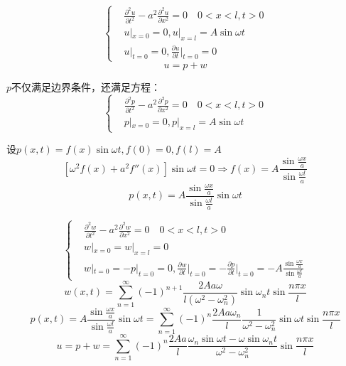 \begin{ex}
$$\left\{\begin{aligned}
&\frac{\partial^2{u}}{\partial{t}^2}-a^2\frac{\partial^2{u}}{\partial{x}^2}=0\quad 0<x<l,t>0\\
&u|_{x=0}=0,u|_{x=l}=A\sin\omega t\\
&u|_{t=0}=0,\frac{\partial{u}}{\partial t}\bigg|_{t=0}=0
\end{aligned}\right.$$
    $$u=p+w$$

    $p$不仅满足边界条件，还满足方程：
$$\left\{
\begin{aligned}
&\frac{\partial^2{p}}{\partial{t}^2}-a^2\frac{\partial^2{p}}{\partial{x}^2}=0\quad 0<x<l,t>0\\
&p|_{x=0}=0,p|_{x=l}=A\sin\omega t
\end{aligned}\right.$$

    设$p(x,t)=f(x)\sin\omega t, f(0)=0,f(l)=A$
    $$[\omega^2f(x)+a^2f''(x)]\sin\omega t=0\Rightarrow f(x)=A\frac{\sin\frac{\omega x}{a}}{\sin\frac{\omega l}{a}}$$
    $$p(x,t)=A\frac{\sin\frac{\omega x}{a}}{\sin\frac{\omega l}{a}}\sin\omega t$$

    $$\left\{\begin{aligned}
&\frac{\partial^2{w}}{\partial{t}^2}-a^2\frac{\partial^2{w}}{\partial{x}^2}=0\quad 0<x<l,t>0\\
&w|_{x=0}=w|_{x=l}=0\\
&w|_{t=0}=-p|_{t=0}=0,\frac{\partial{w}}{\partial t}\bigg|_{t=0}=-\frac{\partial{p}}{\partial t}\bigg|_{t=0}=-A\frac{\sin\frac{\omega x}{a}}{\sin\frac{\omega l}{a}}
\end{aligned}\right.$$
    $$w(x,t)=\sum_{n=1}^\infty(-1)^{n+1}\frac{2Aa\omega}{l(\omega^2-\omega_n^2)}\sin\omega_n t\sin\frac{n\pi x}{l}$$
    $$p(x,t)=A\frac{\sin\frac{\omega x}{a}}{\sin\frac{\omega l}{a}}\sin\omega t=\sum_{n=1}^\infty(-1)^{n}\frac{2Aa\omega_n}{l}\frac{1}{\omega^2-\omega_n^2}\sin\omega t\sin\frac{n\pi x}{l}$$
    $$u=p+w=\sum_{n=1}^\infty(-1)^{n}\frac{2Aa}{l}\frac{\omega_n\sin\omega t-\omega\sin\omega_nt}{\omega^2-\omega_n^2}\sin\frac{n\pi x}{l}$$

\end{ex}
